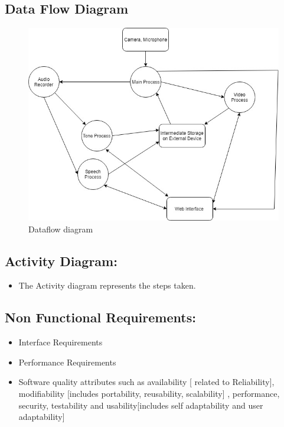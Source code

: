 \documentclass[oneside,a4paper,12pt]{report}
\begin{document}
\begin{normalsize}
\subsection{Data Flow Diagram}   
\begin{center}
	\begin{figure}[!htbp]
		\centering
		\includegraphics[width=\textwidth]{dataflow_proj.jpg}
		\caption{Dataflow diagram}
		\label{fig:dataflowdiag}
	\end{figure}
\end{center}  
\newpage


 
\subsection{Activity Diagram:}
\begin{itemize}
	\item	The Activity diagram represents the steps taken.
\end{itemize} 

\subsection{Non Functional Requirements:}
\begin{itemize}
	\item	Interface Requirements
	\item	Performance Requirements
    \item	Software quality attributes such as availability [ related to Reliability], modifiability [includes portability, reusability, scalability] ,  		performance, security, testability and usability[includes self 			adaptability and user adaptability] 
\end{itemize} 


\end{normalsize}
\end{document}
